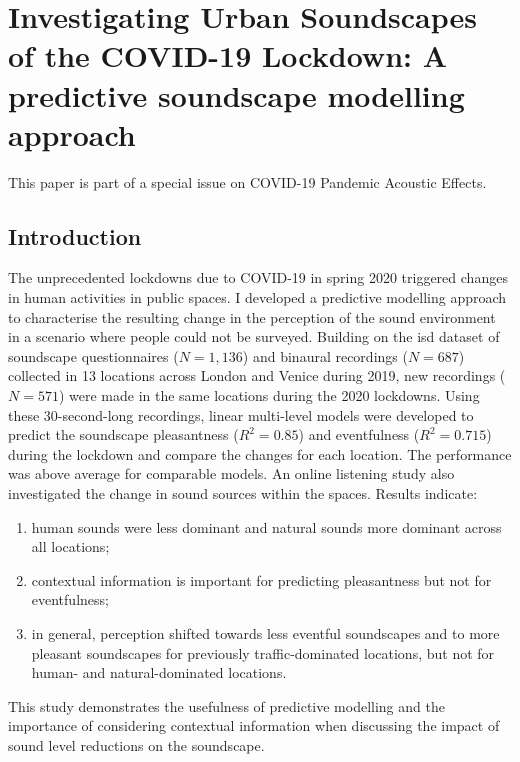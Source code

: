 \chapter{Investigating Urban Soundscapes of the COVID-19 Lockdown: A predictive soundscape modelling approach}
\label{ch:lockdown}

This paper is part of a special issue on COVID-19 Pandemic Acoustic Effects.

\section{Introduction}
\label{sec:intro}
 The unprecedented lockdowns due to COVID-19 in spring 2020 triggered changes in human activities in public spaces. I developed a predictive modelling approach to characterise the resulting change in the perception of the sound environment in a scenario where people could not be surveyed. Building on the \gls{isd} dataset of soundscape questionnaires ($N = 1,136$) and binaural recordings ($N = 687$) collected in 13 locations across London and Venice during 2019, new recordings ($N = 571$) were made in the same locations during the 2020 lockdowns. Using these 30-second-long recordings, linear multi-level models were developed to predict the soundscape pleasantness ($R^2=0.85$) and eventfulness ($R^2=0.715$) during the lockdown and compare the changes for each location. The performance was above average for comparable models. An online listening study also investigated the change in sound sources within the spaces. Results indicate:

 \begin{enumerate}
   \item human sounds were less dominant and natural sounds more dominant across all locations;
   \item contextual information is important for predicting pleasantness but not for eventfulness;
   \item in general, perception shifted towards less eventful soundscapes and to more pleasant soundscapes for previously traffic-dominated locations, but not for human- and natural-dominated locations.
 \end{enumerate}

 This study demonstrates the usefulness of predictive modelling and the importance of considering contextual information when discussing the impact of sound level reductions on the soundscape.

